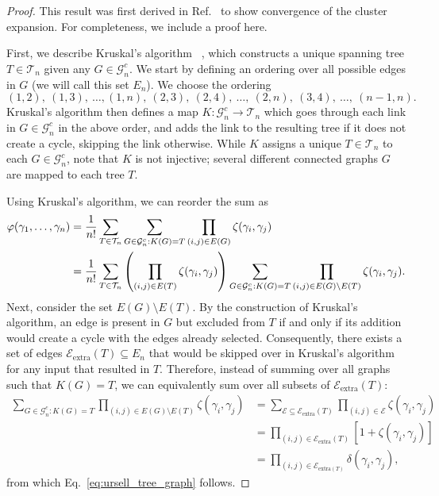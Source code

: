 \begin{proof}
    This result was first derived in Ref.~ to show convergence of the cluster expansion. For completeness, we include a proof here.

First, we describe Kruskal's algorithm~\cite{Kruskal1956,KleinbergTardos2006} , which constructs a unique spanning tree $T \in \mathcal{T}_n$ given any $G \in \mathcal{G}_n^c$. We start by defining an ordering over all possible edges in $G$ (we will call this set $E_n$). We choose the ordering 
\begin{equation}
    (1,2), \ (1,3), \ \dots,(1,n), \ (2,3), \ (2,4), \ \dots, \ (2,n), \ (3,4), \ \dots, \  (n-1,n).
\end{equation}
Kruskal's algorithm then defines a map $K: \mathcal{G}_n^c \to \mathcal{T}_n$ which goes through each link in $G \in \mathcal{G}_n^c$ in the above order, and adds the link to the resulting tree if it does not create a cycle, skipping the link otherwise. While $K$ assigns a unique $T \in \mathcal{T}_n$ to each $G \in \mathcal{G}^c_n$, note that $K$ is not injective; several different connected graphs $G$ are mapped to each tree $T$.

Using Kruskal's algorithm, we can reorder the sum as
\begin{subequations}
\begin{align}
    \varphi(\gamma_1, \dots, \gamma_n) &= \frac{1}{n!} \sum_{T \in \mathcal{T}_n} \sum_{G \in \mathcal{G}_n^c : K(G) = T} \prod_{(i,j) \in E(G)} \zeta(\gamma_i,\gamma_j) \\
    &= \frac{1}{n!} \sum_{T \in \mathcal{T}_n} \left( \prod_{(i,j) \in E(T)}\zeta(\gamma_i,\gamma_j)  \right) \sum_{G \in \mathcal{G}_n^c : K(G) = T} \prod_{(i,j) \in E(G) \setminus E(T)} \zeta(\gamma_i,\gamma_j) .
\end{align}
\end{subequations}
Next, consider the set $E(G) \setminus E(T)$. By the construction of Kruskal's algorithm, an edge is present in $G$ but excluded from $T$ if and only if its addition would create a cycle with the edges already selected. Consequently, there exists a set of edges $\mathcal{E}_{\text{extra}}(T) \subseteq E_n$ that would be skipped over in Kruskal's algorithm for any input that resulted in $T$. Therefore, instead of summing over all graphs such that $K(G) = T$, we can equivalently sum over all subsets of $\mathcal{E}_{\text{extra}}(T)$:
\begin{subequations}
\begin{align}
    \sum_{G \in \mathcal{G}_n^c : K(G) = T} \prod_{(i,j) \in E(G) \setminus E(T)} \zeta(\gamma_i,\gamma_j) &= \sum_{\mathcal{E} \subseteq \mathcal{E}_{\text{extra}}(T)} \prod_{(i,j) \in \mathcal{E}} \zeta(\gamma_i, \gamma_j) \\
    &= \prod_{(i,j) \in \mathcal{E}_{\text{extra}}(T)} [1 + \zeta(\gamma_i,\gamma_j)] \\
    &= \prod_{(i, j) \in \mathcal{E}_{\text{extra}(T)}} \delta(\gamma_i, \gamma_j) ,
\end{align}
\end{subequations}
from which Eq.~\eqref{eq:ursell_tree_graph} follows.
\end{proof}

